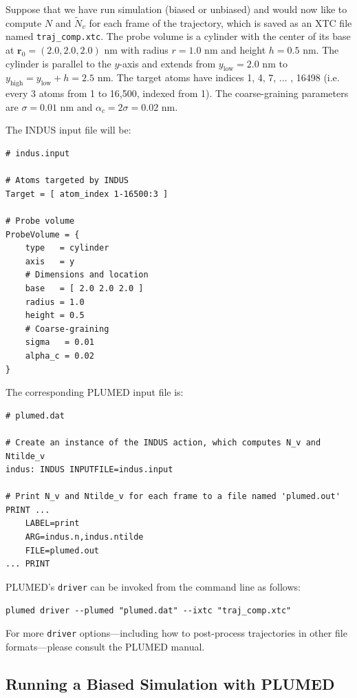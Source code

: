 \documentclass[11pt,notitlepage]{article}
\begin{document}
Suppose that we have run simulation (biased or unbiased) and would now like to compute $N$ and $\tilde{N}_v$ for each frame of the trajectory, which is saved as an XTC file named \texttt{traj\_comp.xtc}. The probe volume is a cylinder with the center of its base at $\mathbf{r}_0 = (2.0, 2.0, 2.0)$ nm with radius $r = 1.0$ nm and height $h = 0.5$ nm. The cylinder is parallel to the $y$-axis and extends from $y_{\text{low}} = 2.0$ nm to $y_{\text{high}} = y_{\text{low}} + h = 2.5$ nm. The target atoms have indices 1, 4, 7, ... , 16498 (i.e. every 3 atoms from 1 to 16,500, indexed from 1). The coarse-graining parameters are $\sigma = 0.01$ nm and $\alpha_c = 2 \sigma = 0.02$ nm.

The INDUS input file will be:
\begin{lstlisting}
# indus.input

# Atoms targeted by INDUS
Target = [ atom_index 1-16500:3 ]

# Probe volume
ProbeVolume = {
	type   = cylinder
	axis   = y
	# Dimensions and location
	base   = [ 2.0 2.0 2.0 ]
	radius = 1.0
	height = 0.5
	# Coarse-graining
	sigma   = 0.01
	alpha_c = 0.02
}
\end{lstlisting}

\noindent The corresponding PLUMED input file is:
\begin{lstlisting}
# plumed.dat

# Create an instance of the INDUS action, which computes N_v and Ntilde_v
indus: INDUS INPUTFILE=indus.input

# Print N_v and Ntilde_v for each frame to a file named 'plumed.out'
PRINT ...
	LABEL=print
	ARG=indus.n,indus.ntilde
	FILE=plumed.out
... PRINT
\end{lstlisting}


PLUMED's \texttt{driver} can be invoked from the command line as follows:

\begin{lstlisting}
plumed driver --plumed "plumed.dat" --ixtc "traj_comp.xtc"
\end{lstlisting}

For more \texttt{driver} options---including how to post-process trajectories in other file formats---please consult the PLUMED manual.


\subsection{Running a Biased Simulation with PLUMED}
\end{document}
